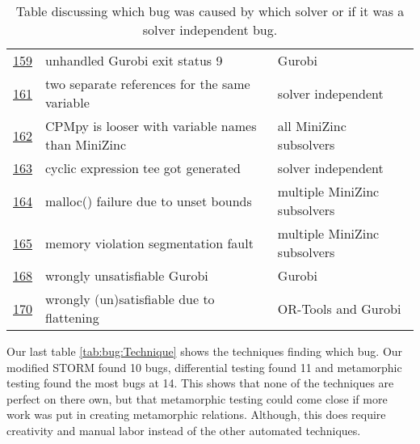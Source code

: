 \begin{table}[]
\begin{tabular}{lll}
		\href{https://github.com/CPMpy/cpmpy/issues/159}{159}   & unhandled Gurobi exit status 9                            & Gurobi                                         \\
		\href{https://github.com/CPMpy/cpmpy/issues/161}{161}   & two separate references for the same variable             & solver independent                             \\
		\href{https://github.com/CPMpy/cpmpy/issues/162}{162}   & CPMpy is looser with variable names than MiniZinc         & all MiniZinc subsolvers                        \\
		\href{https://github.com/CPMpy/cpmpy/issues/163}{163}   & cyclic expression tee got generated                       & solver independent                             \\
		\href{https://github.com/CPMpy/cpmpy/issues/164}{164}   & malloc() failure due to unset bounds                      & multiple MiniZinc subsolvers                   \\
		\href{https://github.com/CPMpy/cpmpy/issues/165}{165}   & memory violation segmentation fault                       & multiple MiniZinc subsolvers                   \\
		\href{https://github.com/CPMpy/cpmpy/issues/168}{168}   & wrongly unsatisfiable Gurobi                              & Gurobi                                         \\
		\href{https://github.com/CPMpy/cpmpy/issues/170}{170}   & wrongly (un)satisfiable due to flattening                 & OR-Tools and Gurobi                            \\ \bottomrule
	\end{tabular}
	\caption{Table discussing which bug was caused by which solver or if it was a solver independent bug.}
	\label{tab:bug:Solver}
\end{table}

Our last table \ref{tab:bug:Technique} shows the techniques finding which bug. Our modified STORM found 10 bugs, differential testing found 11 and metamorphic testing found the most bugs at 14. This shows that none of the techniques are perfect on there own, but that metamorphic testing could come close if more work was put in creating metamorphic relations. Although, this does require creativity and manual labor instead of the other automated techniques.

